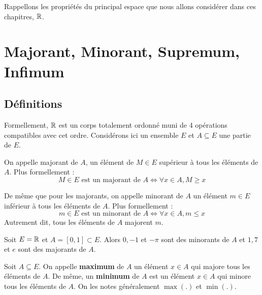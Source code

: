 
\minitoc  %

Rappellons les propriétés du principal espace que nous allons considérer dans ces chapitres, $\mathbb{R}$. 


\section{Majorant, Minorant, Supremum, Infimum}

\subsection{Définitions}

Formellement, $\mathbb{R}$ est un corps totalement ordonné muni de 4 opérations compatibles avec cet ordre. 
Considérons ici un ensemble $E$ et $A \subseteq E$ une partie de $E$. 

\begin{definition}[Majorant]
    On appelle majorant de $A$, un élément de $M \in E$ supérieur à tous les éléments de $A$. 
    Plus formellement :
        \[ M \in E \text{ est un majorant de } A \iff \forall x \in A, M \geqslant x \] 
\end{definition}

\begin{definition}[Minorant]
    De même que pour les majorants, on appelle minorant de $A$ un élément $m \in E$ inférieur à tous les éléments de $A$. 
    Plus formellement :
        \[ m \in E \text{ est un minorant de } A \iff \forall x \in A, m \leqslant x \] 
    Autrement dit, tous les éléments de $A$ majorent $m$.
\end{definition}

\begin{example}
    Soit $E = \mathbb{R}$ et $A = [0,1] \subset E$. Alors $0,-1$ et $-\pi$ sont des minorants de $A$
    et $1, 7$ et $ e$ sont des majorants de $A$. 
\end{example}

\begin{definition}
    Soit $A \subseteq E$. On appelle \textbf{maximum} de $A$ un élément $x \in A$ qui majore tous les éléments de $A$. 
    De même, un \textbf{minimum} de $A$ est un élément $x \in A$ qui minore tous les éléments de $A$. 
    On les notes généralement $\max(.)$ et $\min(.)$.
\end{definition}


